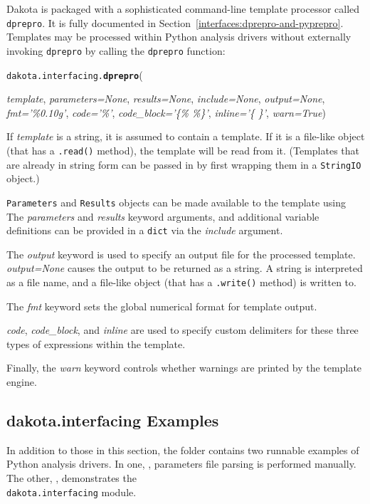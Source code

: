 Dakota is packaged with a sophisticated command-line template processor
called \texttt{dprepro}. It is fully documented in 
Section~\ref{interfaces:dprepro-and-pyprepro}. Templates may be processed 
within Python analysis drivers without externally invoking \texttt{dprepro} 
by calling the \texttt{dprepro} function:

\label{index:dakota.interfacing.dprepro}\texttt{dakota.interfacing.}\textbf{\texttt{dprepro}}({\emph{template}, \emph{parameters=None}, \emph{results=None}, \emph{include=None},
	\emph{output=None}, \emph{fmt='\%0.10g'}, \emph{code='\%'}, \emph{code\_block='\{\% \%\}'},
		\emph{inline='\{ \}'}, \emph{warn=True}){}

If \emph{template} is a string, it is assumed to contain a template. If it 
is a file-like object (that has a \texttt{.read()}
method), the template will be read from it. (Templates that are already in
string form can be passed in by first wrapping them in a \texttt{StringIO}
object.)

\texttt{Parameters} and \texttt{Results} objects can be made available to the
template using The \emph{parameters} and \emph{results} keyword arguments, and 
additional variable definitions can be provided in a \texttt{dict} via the
\emph{include} argument.

The \emph{output} keyword is used to specify an output file for the processed 
template. \emph{output=None} causes the output to be returned as a string. A
string is interpreted as a file name, and a file-like object (that has a 
\texttt{.write()} method) is written to.

The \emph{fmt} keyword sets the global numerical format for template output.

\emph{code}, \emph{code\_block}, and \emph{inline} are used to specify custom 
delimiters for these three types of expressions within the template.

Finally, the \emph{warn} keyword controls whether warnings are printed by the
template engine.

\subsection{dakota.interfacing Examples}

In addition to those in this section, the  folder contains two runnable examples of Python analysis drivers. In one, , parameters file parsing is performed manually. The other, , demonstrates the\\{\tt dakota.interfacing} module.

}
